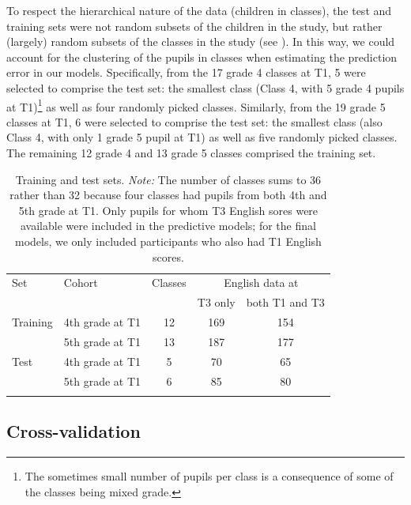 \documentclass[output=paper]{langsci/langscibook}
\begin{document}
To respect the hierarchical nature of the data (children in classes), the test and training sets were not random subsets of the children in the study, but rather (largely) random subsets of the classes in the study (see \citealt{RobertsEtAl2017}). In this way, we could account for the clustering of the pupils in classes when estimating the prediction error in our models. Specifically, from the 17 grade 4 classes at T1, 5 were selected to comprise the test set: the smallest class (Class 4, with 5 grade 4 pupils at T1)\footnote{The sometimes small number of pupils per class is a consequence of some of the classes being mixed grade.} as well as four randomly picked classes. Similarly, from the 19 grade 5 classes at T1, 6 were selected to comprise the test set: the smallest class (also Class 4, with only 1 grade 5 pupil at T1) as well as five randomly picked classes. The remaining 12 grade 4 and 13 grade 5 classes comprised the training set.


\begin{table}
\caption{Training and test sets. \emph{Note:} The number of classes sums to 36 rather than 32 because four classes had pupils from both 4th and 5th grade at T1. Only pupils for whom T3 English sores were available were included in the predictive models; for the final models, we only included participants who also had T1 English scores.\label{tab:04:1}}
\begin{tabular}{ll *{3}{c}}
\lsptoprule
{Set} & {Cohort} & {Classes} & \multicolumn{2}{c}{English data at}\\\cmidrule(lr){4-5}
      &          &           & {T3 only} & {both T1 and T3}\\\midrule
{Training} & {4th grade at T1} & {12} & {169} & {154}\\
           & {5th grade at T1} & {13} & {187} & {177}\\
{Test}     & {4th grade at T1} & {5} & {70} & {65}\\
           & {5th grade at T1} & {6} & {85} & {80}\\
\lspbottomrule
\end{tabular}
\end{table}


\subsection{Cross-validation}
\end{document}
